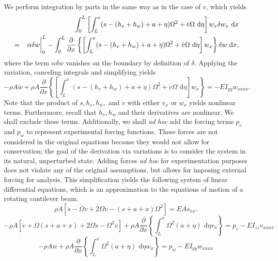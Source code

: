 We perform integration by parts in the same way as in the case of $v$, which yields
\begin{eqnarray}
& &\int_0^L \left[\int_L^x(s-(h_v+h_w)+a+\eta)\Omega^2+\dot v\Omega\text{ d}\eta\right] w_{x}\delta w_x\text{ d}x \\
&=& \left.\vphantom{\frac{0}{0}}\alpha\delta w\right|_0^L-\int_0^L\frac{\partial }{\partial x}\left\lbrace\left[\int_L^x( s-(h_v+h_w)+a+\eta)\Omega^2+\dot v\Omega\text{ d}\eta\right] w_{x}\right\rbrace\delta w\text{ d}x,\nonumber
\end{eqnarray}
where the term $\alpha\delta w$ vanishes on the boundary by definition of $\delta$.
Applying the variation, canceling integrals and simplifying yields
\begin{equation}
\label{eq:w.full.nonlinear}
-\rho A \ddot w+\rho A \frac{\partial }{\partial x}\left\lbrace\left[\int_L^x( s-(h_v+h_w)+a+\eta)\Omega^2+\dot v\Omega\text{ d}\eta\right] w_{x}\right\rbrace = -EI_{yy} w_{xxxx}.
\end{equation}
Note that the product of $s,h_v,h_w,$ and $\dot v$ with either $v_{x}$ or $w_{x}$ yields nonlinear terms. Furthermore, recall that $h_v,h_w$ and their derivatives are nonlinear. We shall exclude these terms. Additionally, we shall \emph{ad hoc} add the forcing terms $p_v$ and $p_w$ to represent experimental forcing functions. These forces are not considered in the original equations because they would not allow for conservation; the goal of the derivation via variations is to consider the system in its natural, unperturbed state. Adding forces \emph{ad hoc} for experimentation purposes does not violate any of the original assumptions, but allows for imposing external forcing for analysis. This simplification yields the following system of linear differential equations, which is an approximation to the equations of motion of a rotating cantilever beam.
\begin{equation}
\rho A \left[\ddot s-\dot \Omega v+2\Omega\dot v-(s+a+x)\Omega^2\right] = EAs_{xx}.
\label{eq:EL_s_final}
\end{equation}
\begin{equation}
-\rho A [\ddot v + \dot \Omega (s+a+x)+2\Omega\dot s-\Omega^2v]+\rho A\frac{\partial}{\partial x}\left\lbrace \int_L^x\Omega^2(a+\eta)\text{ d}\eta v_{x}\right\rbrace = p_v-EI_{zz}v_{xxxx} 
\label{eq:EL_v_final}
\end{equation}
\begin{equation}
-\rho A \ddot w+\rho A \frac{\partial}{\partial x}\left\lbrace\int_L^x\Omega^2(a+\eta)\text{ d}\eta w_{x}\right\rbrace = p_w-EI_{yy} w_{xxxx}
\label{eq:EL_w_final}
\end{equation}

